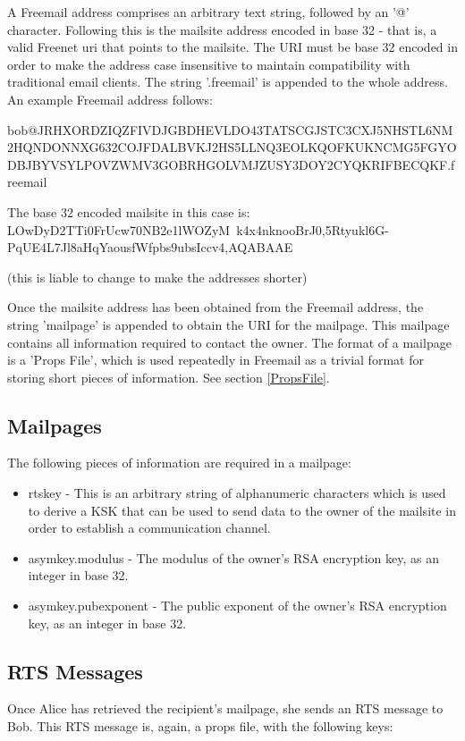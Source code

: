 \documentclass[12pt,a4paper]{article}
\begin{document}
A Freemail address comprises an arbitrary text string, followed by an '@' character. Following this is the mailsite address encoded in base 32 - that is, a valid Freenet uri that points to the mailsite. The URI must be base 32 encoded in order to make the address case insensitive to maintain compatibility with traditional email clients. The string '.freemail' is appended to the whole address. An example Freemail address follows:

bob@JRHXORDZIQZFIVDJ\-GBDHEVLDO43TATSCGJST\-C3CXJ5NHSTL6NM2HQ\-NDONNXG632COJFD\-ALBVKJ2HS5LLNQ3E\-OLKQOFKUKNCMG5F\-GYODBJBY\-VSYLPOVZ\-WMV3GOBRHGOLVMJ\-ZUSY3DOY2CY\-QKRIFBECQKF.freemail

The base 32 encoded mailsite in this case is: LOwDyD2TTi0FrUcw70N\-B2e1lWOZyM~k4x4n\-knooBrJ0,5Rtyu\-kl6G-PqUE4L7\-Jl8aHqYaous\-fWfpbs9ubsI\-ccv4,AQABAAE

(this is liable to change to make the addresses shorter)

Once the mailsite address has been obtained from the Freemail address, the string 'mailpage' is appended to obtain the URI for the mailpage. This mailpage contains all information required to contact the owner. The format of a mailpage is a 'Props File', which is used repeatedly in Freemail as a trivial format for storing short pieces of information. See section \ref{PropsFile}.

\subsection{Mailpages}
The following pieces of information are required in a mailpage:

\begin{itemize}
\item rtskey - This is an arbitrary string of alphanumeric characters which is used to derive a KSK that can be used to send data to the owner of the mailsite in order to establish a communication channel.
\item asymkey.modulus - The modulus of the owner's RSA encryption key, as an integer in base 32.
\item asymkey.pubexponent - The public exponent of the owner's RSA encryption key, as an integer in base 32.
\end{itemize}

\subsection{RTS Messages}
Once Alice has retrieved the recipient's mailpage, she sends an RTS message to Bob. This RTS message is, again, a props file, with the following keys:
\end{document}
